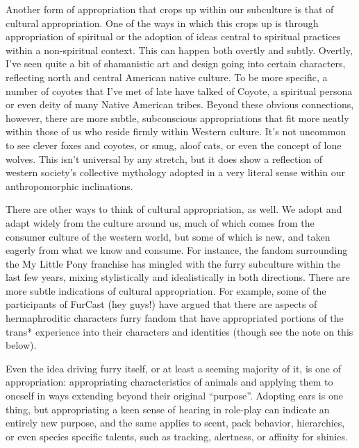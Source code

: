 Another form of appropriation that crops up within our subculture is that of cultural appropriation. One of the ways in which this crops up is through appropriation of spiritual or the adoption of ideas central to spiritual practices within a non-spiritual context. This can happen both overtly and subtly. Overtly, I've seen quite a bit of shamanistic art and design going into certain characters, reflecting north and central American native culture. To be more specific, a number of coyotes that I've met of late have talked of Coyote, a spiritual persona or even deity of many Native American tribes. Beyond these obvious connections, however, there are more subtle, subconscious appropriations that fit more neatly within those of us who reside firmly within Western culture. It's not uncommon to see clever foxes and coyotes, or smug, aloof cats, or even the concept of lone wolves. This isn't universal by any stretch, but it does show a reflection of western society's collective mythology adopted in a very literal sense within our anthropomorphic inclinations.

There are other ways to think of cultural appropriation, as well. We adopt and adapt widely from the culture around us, much of which comes from the consumer culture of the western world, but some of which is new, and taken eagerly from what we know and consume. For instance, the fandom surrounding the My Little Pony franchise has mingled with the furry subculture within the last few years, mixing stylistically and idealistically in both directions. There are more subtle indications of cultural appropriation. For example, some of the participants of FurCast (hey guys!) have argued that there are aspects of hermaphroditic characters furry fandom that have appropriated portions of the trans* experience into their characters and identities (though see the note on this below).

Even the idea driving furry itself, or at least a seeming majority of it, is one of appropriation: appropriating characteristics of animals and applying them to oneself in ways extending beyond their original ``purpose''. Adopting ears is one thing, but appropriating a keen sense of hearing in role-play can indicate an entirely new purpose, and the same applies to scent, pack behavior, hierarchies, or even species specific talents, such as tracking, alertness, or affinity for shinies.

